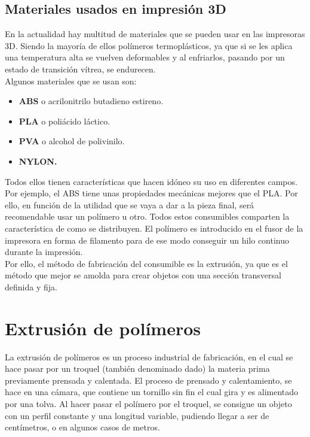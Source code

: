 \subsection{Materiales usados en impresión 3D}
\label{impreso_materiales}
En la actualidad hay multitud de materiales que se pueden usar en las impresoras 3D. Siendo la mayoría de ellos polímeros termoplásticos, ya que si se les aplica una temperatura alta se vuelven deformables y al enfriarlos, pasando por un estado de transición vítrea, se endurecen.\\

Algunos materiales que se usan son:
\begin{itemize}
    \item \textbf{ABS} o acrilonitrilo butadieno estireno.
    \item \textbf{PLA} o poliácido láctico.
    \item \textbf{PVA} o alcohol de polivinilo.
    \item \textbf{NYLON.}
\end{itemize}

Todos ellos tienen características que hacen idóneo su uso en diferentes campos. Por ejemplo, el ABS tiene unas propiedades mecánicas mejores que el PLA\cite{tfg_antonio}. Por ello, en función de la utilidad que se vaya a dar a la pieza final, será recomendable usar un polímero u otro. Todos estos consumibles comparten la característica de como se distribuyen. El polímero es introducido en el fusor de la impresora en forma de filamento para de ese modo conseguir un hilo continuo durante la impresión.\\

Por ello, el método de fabricación del consumible es la extrusión, ya que es el método que mejor se amolda para crear objetos con una sección transversal definida y fija.

\section{Extrusión de polímeros}
\label{arte_extrusion}
La extrusión de polímeros es un proceso industrial de fabricación, en el cual se hace pasar por un troquel (también denominado dado) la materia prima previamente prensada y calentada. El proceso de prensado y calentamiento, se hace en una cámara, que contiene un tornillo sin fin el cual gira y es alimentado por una tolva. Al hacer pasar el polímero por el troquel, se consigue un objeto con un perfil constante y una longitud variable, pudiendo llegar a ser de centímetros, o en algunos casos de metros.

